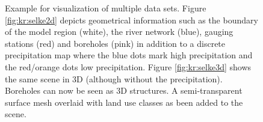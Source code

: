 \begin{figure}[tb]
\begin{center}
\enspace
{}
\end{center}
\caption{Example for visualization of multiple data sets. Figure \ref{fig:kr:selke2d} depicts geometrical information such as the boundary of the model region (white), the river network (blue), gauging stations (red) and boreholes (pink) in addition to a discrete precipitation map where the blue dots mark high precipitation and the red/orange dots low precipitation. Figure \ref{fig:kr:selke3d} shows the same scene in 3D (although without the precipitation). Boreholes can now be seen as 3D structures. A semi-transparent surface mesh overlaid with land use classes as been added to the scene.} \label{fig:kr:vis}
\end{figure}

